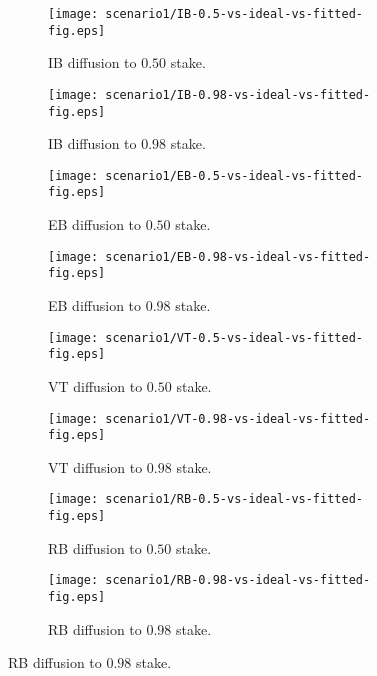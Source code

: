 \documentclass[11pt,a4paper]{article}
\begin{document}
\begin{figure}[htbp]
    \centering
    \begin{subfigure}[b]{0.45\textwidth}
        \centering
        \texttt{[image: scenario1/IB-0.5-vs-ideal-vs-fitted-fig.eps]}
        \caption{IB diffusion to $0.50$ stake.}
        \label{scenario1:ib0.5}
    \end{subfigure}
    \hfill
    \begin{subfigure}[b]{0.45\textwidth}
        \centering
        \texttt{[image: scenario1/IB-0.98-vs-ideal-vs-fitted-fig.eps]}
        \caption{IB diffusion to $0.98$ stake.}
        \label{scenario1:ib0.98}
    \end{subfigure}
    
    \vspace{1em}
    
    \begin{subfigure}[b]{0.45\textwidth}
        \centering
        \texttt{[image: scenario1/EB-0.5-vs-ideal-vs-fitted-fig.eps]}
        \caption{EB diffusion to $0.50$ stake.}
        \label{scenario1:eb0.5}
    \end{subfigure}
    \hfill
    \begin{subfigure}[b]{0.45\textwidth}
        \centering
        \texttt{[image: scenario1/EB-0.98-vs-ideal-vs-fitted-fig.eps]}
        \caption{EB diffusion to $0.98$ stake.}
        \label{scenario1:eb0.98}
    \end{subfigure}
    
    \vspace{1em}
    
    \begin{subfigure}[b]{0.45\textwidth}
        \centering
        \texttt{[image: scenario1/VT-0.5-vs-ideal-vs-fitted-fig.eps]}
        \caption{VT diffusion to $0.50$ stake.}
        \label{scenario1:vt0.5}
    \end{subfigure}
    \hfill
    \begin{subfigure}[b]{0.45\textwidth}
        \centering
        \texttt{[image: scenario1/VT-0.98-vs-ideal-vs-fitted-fig.eps]}
        \caption{VT diffusion to $0.98$ stake.}
        \label{scenario1:vt0.98}
    \end{subfigure}
    
    \vspace{1em}
    
    \begin{subfigure}[b]{0.45\textwidth}
        \centering
        \texttt{[image: scenario1/RB-0.5-vs-ideal-vs-fitted-fig.eps]}
        \caption{RB diffusion to $0.50$ stake.}
        \label{scenario1:rb0.5}
    \end{subfigure}
    \hfill
    \begin{subfigure}[b]{0.45\textwidth}
        \centering
        \texttt{[image: scenario1/RB-0.98-vs-ideal-vs-fitted-fig.eps]}
        \caption{RB diffusion to $0.98$ stake.}
        \label{scenario1:rb0.98}
    \end{subfigure}


\end{figure}
\end{document}
